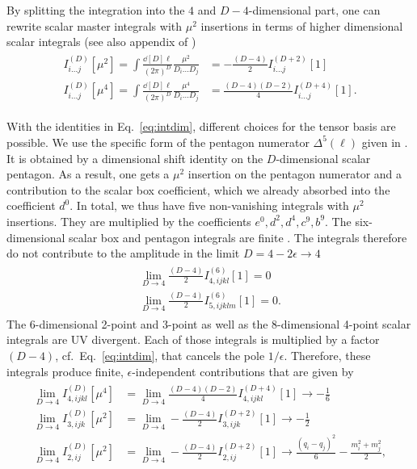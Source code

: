 By splitting the integration into the $4$ and $D-4$-dimensional part,
one can rewrite scalar master integrals with $\mu^2$ insertions in
terms of higher dimensional scalar integrals \cite{Giele:2008ve,Badger:2008cm} (see also appendix of \cite{Bern:1995db}) 
\begin{align}\label{eq:intdim}
\begin{split}
  I_{i\dots j}^{(D)}[\mu^2]=\int\frac{\dd[D]{\ell}}{(2\pi)^{D}}\frac{\mu^2}{D_i\dots
    D_j} &= -\frac{(D-4)}{2} I_{i\dots j}^{(D+2)}[1]\\
  I_{i\dots j}^{(D)}[\mu^4]=\int\frac{\dd[D]{\ell}}{(2\pi)^{D}}\frac{\mu^4}{D_i\dots
    D_j}&= \frac{(D-4)(D-2)}{4} I_{i\dots j}^{(D+4)}[1].
\end{split}
\end{align}

With the identities in Eq.~\eqref{eq:intdim}, different choices for
the tensor basis are possible. We use the specific form of the pentagon numerator
$\Delta^5(\ell)$ given in \cite{Badger:2008cm}. It is
obtained by a dimensional shift identity on the $D$-dimensional scalar
pentagon. As a result, one gets a $\mu^2$ insertion on the pentagon
numerator and a contribution to the scalar box coefficient, which we
already absorbed into the coefficient $d^0$. In total, we thus have five non-vanishing integrals with $\mu^2$ insertions. They are
multiplied by the coefficients $e^0,d^2,d^4,c^9,b^9$. The six-dimensional
scalar box and pentagon integrals are finite \cite{Bern1993}. The
integrals therefore do not contribute to the amplitude in the limit
$D=4-2\epsilon \rightarrow 4$
\begin{align}\label{eq:vanint}
\begin{split}
\lim_{D\rightarrow 4}\frac{(D-4)}{2} I^{(6)}_{4,ijkl}[1] = 0\\
\lim_{D\rightarrow 4}\frac{(D-4)}{2} I^{(6)}_{5,ijklm}[1] = 0.
\end{split}
\end{align}
The 6-dimensional 2-point and 3-point as well as the 8-dimensional
4-point scalar integrals are UV divergent. Each of those integrals is
multiplied by a factor $(D-4)$, cf.~Eq.~\eqref{eq:intdim}, that
cancels the pole $1/\epsilon$. Therefore, these integrals produce finite,
$\epsilon$-independent contributions that are given by
\begin{align}\label{eq:finiterint}
\begin{split}
  \lim_{D\rightarrow 4} I_{4,ijkl}^{(D)}[\mu^4]&= \lim_{D\rightarrow 4}\frac{(D-4)(D-2)}{4}I_{4,ijkl}^{(D+4)}[1] \rightarrow -\frac{1}{6}\\
   \lim_{D\rightarrow 4} I_{3,ijk}^{(D)}[\mu^2]&= \lim_{D\rightarrow 4}-\frac{(D-4)}{2}I_{3,ijk}^{(D+2)}[1] \rightarrow -\frac{1}{2}\\
    \lim_{D\rightarrow 4} I_{2,ij}^{(D)}[\mu^2]&= \lim_{D\rightarrow
      4}-\frac{(D-4)}{2}I_{2,ij}^{(D+2)}[1] \rightarrow
    \frac{(q_i-q_j)^2}{6} - \frac{m_i^2+m_j^2}{2},
\end{split}
\end{align}
